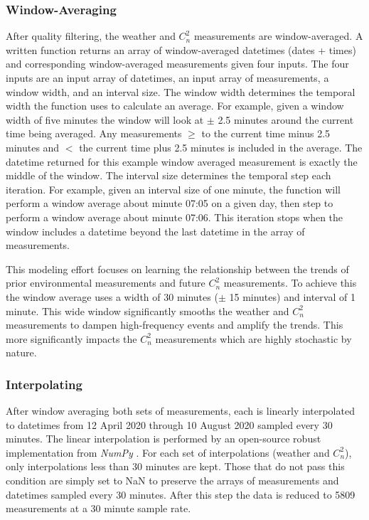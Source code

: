\subsubsection{Window-Averaging}
After quality filtering, the weather and $C_{n}^{2}$ measurements are window-averaged. A written function returns an array of window-averaged datetimes (dates + times) and corresponding window-averaged measurements given four inputs. The four inputs are an input array of datetimes, an input array of measurements, a window width, and an interval size. The window width determines the temporal width the function uses to calculate an average. For example, given a window width of five minutes the window will look at $\pm$ 2.5 minutes around the current time being averaged. Any measurements $\ge$ to the current time minus 2.5 minutes and $<$ the current time plus 2.5 minutes is included in the average. The datetime returned for this example window averaged measurement is exactly the middle of the window. The interval size determines the temporal step each iteration. For example, given an interval size of one minute, the function will perform a window average about minute 07:05 on a given day, then step to perform a window average about minute 07:06. This iteration stops when the window includes a datetime beyond the last datetime in the array of measurements.

This modeling effort focuses on learning the relationship between the trends of prior environmental measurements and future $C_{n}^{2}$ measurements. To achieve this the window average uses a width of 30 minutes ($\pm$ 15 minutes) and interval of 1 minute. This wide window significantly smooths the weather and $C_{n}^{2}$ measurements to dampen high-frequency events and amplify the trends. This more significantly impacts the $C_{n}^{2}$ measurements which are highly stochastic by nature. 

\subsubsection{Interpolating}
After window averaging both sets of measurements, each is linearly interpolated to datetimes from 12 April 2020 through 10 August 2020 sampled every 30 minutes. The linear interpolation is performed by an open-source robust implementation from \textit{NumPy} \cite{harris2020array}. For each set of interpolations (weather and $C_{n}^{2}$), only interpolations less than 30 minutes are kept. Those that do not pass this condition are simply set to \ac{NaN} to preserve the arrays of measurements and datetimes sampled every 30 minutes. After this step the data is reduced to 5809 measurements at a 30 minute sample rate.

